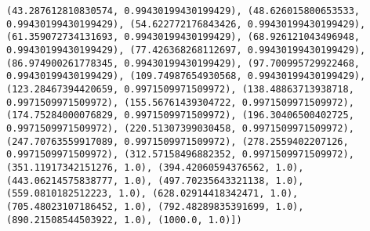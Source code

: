 \documentclass[11pt]{article}
\begin{document}
\begin{Verbatim}[commandchars=\\\{\}]
(43.287612810830574, 0.99430199430199429), (48.626015800653533, 0.99430199430199429), (54.622772176843426, 0.99430199430199429), (61.359072734131693, 0.99430199430199429), (68.926121043496948, 0.99430199430199429), (77.426368268112697, 0.99430199430199429), (86.974900261778345, 0.99430199430199429), (97.700995729922468, 0.99430199430199429), (109.74987654930568, 0.99430199430199429), (123.28467394420659, 0.9971509971509972), (138.48863713938718, 0.9971509971509972), (155.56761439304722, 0.9971509971509972), (174.75284000076829, 0.9971509971509972), (196.30406500402725, 0.9971509971509972), (220.51307399030458, 0.9971509971509972), (247.70763559917089, 0.9971509971509972), (278.2559402207126, 0.9971509971509972), (312.57158496882352, 0.9971509971509972), (351.11917342151276, 1.0), (394.42060594376562, 1.0), (443.06214575838777, 1.0), (497.70235643321138, 1.0), (559.0810182512223, 1.0), (628.02914418342471, 1.0), (705.48023107186452, 1.0), (792.48289835391699, 1.0), (890.21508544503922, 1.0), (1000.0, 1.0)])

\end{Verbatim}
\end{document}

